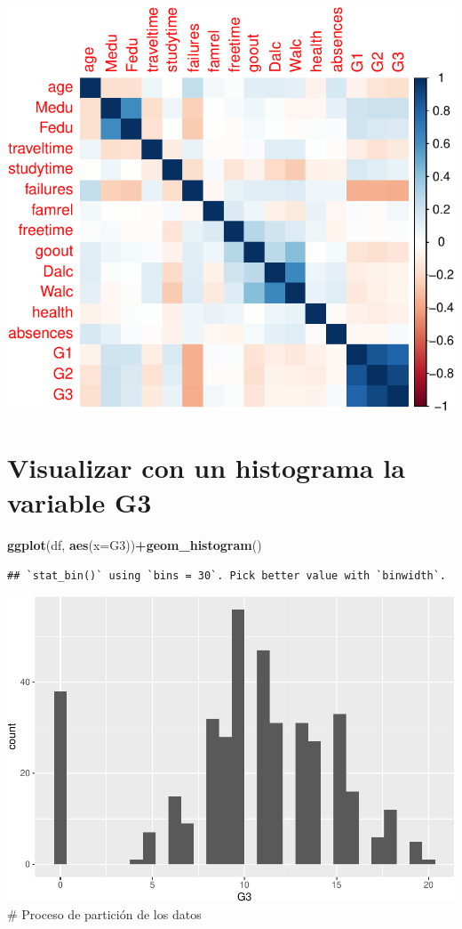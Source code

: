 \documentclass[
]{article}
\newenvironment{Shaded}{\begin{snugshade}}{\end{snugshade}}
\newcommand{\DataTypeTok}[1]{\textcolor[rgb]{0.13,0.29,0.53}{#1}}
\newcommand{\KeywordTok}[1]{\textcolor[rgb]{0.13,0.29,0.53}{\textbf{#1}}}
\newcommand{\NormalTok}[1]{#1}
\newcommand{\OperatorTok}[1]{\textcolor[rgb]{0.81,0.36,0.00}{\textbf{#1}}}
\begin{document}
\includegraphics{Lab2_files/figure-latex/unnamed-chunk-9-1.pdf}

\hypertarget{visualizar-con-un-histograma-la-variable-g3}{%
\section{Visualizar con un histograma la variable
G3}\label{visualizar-con-un-histograma-la-variable-g3}}

\begin{Shaded}
\begin{Highlighting}[]
\KeywordTok{ggplot}\NormalTok{(df, }\KeywordTok{aes}\NormalTok{(}\DataTypeTok{x=}\NormalTok{G3))}\OperatorTok{+}\KeywordTok{geom_histogram}\NormalTok{()}
\end{Highlighting}
\end{Shaded}

\begin{verbatim}
## `stat_bin()` using `bins = 30`. Pick better value with `binwidth`.
\end{verbatim}

\includegraphics{Lab2_files/figure-latex/unnamed-chunk-10-1.pdf} \#
Proceso de partición de los datos
\end{document}
